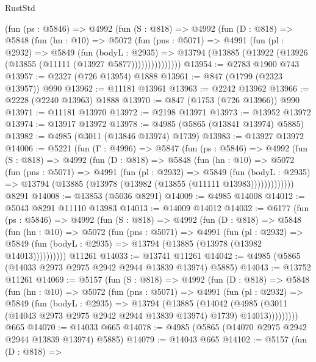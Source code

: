 \begin{lexlean}{RustStd}
\begin{coremodule}
        (fun (ps : @5846) =>
        @4992
          (fun (S : @818) =>
          @4992
            (fun (D : @818) =>
            @5848
              (fun (hn : @10) =>
              @5072
                (fun (pns : @5071) =>
                @4991
                  (fun (pl : @2932) =>
                  @5849
                    (fun (bodyL : @2935) =>
                    @13794 (@13885 (@13922 (@13926 (@13855 (@11111 (@13927 @5877)))))))))))))))
@13954 := @2783 @1900 @743
@13957 := @2327 (@726 @13954) @1888
@13961 := @847 (@1799 (@2323 @13957)) @990
@13962 := @11181 @13961
@13963 := @2242 @13962
@13966 := @2228 (@2240 @13963) @1888
@13970 := @847 (@1753 (@726 @13966)) @990
@13971 := @11181 @13970
@13972 := @2198 @13971
@13973 := @13952 @13972
@13974 := @13917 @13972
@13978 := @4985 (@5865 (@13841 @13974) @5885)
@13982 := @4985 (@3011 (@13846 @13974) @1739)
@13983 := @13927 @13972
@14006 := @5221
    (fun (Γ : @4996) =>
    @5847
      (fun (ps : @5846) =>
      @4992
        (fun (S : @818) =>
        @4992
          (fun (D : @818) =>
          @5848
            (fun (hn : @10) =>
            @5072
              (fun (pns : @5071) =>
              @4991
                (fun (pl : @2932) =>
                @5849
                  (fun (bodyL : @2935) =>
                  @13794 (@13885 (@13978 (@13982 (@13855 (@11111 @13983)))))))))))))
    @8291
@14008 := @13853 (@5036 @8291)
@14009 := @4985 @14008
@14012 := @5043 @8291 @11110 @13983
@14013 := @14009 @14012
@14032 := @6177
    (fun (ps : @5846) =>
    @4992
      (fun (S : @818) =>
      @4992
        (fun (D : @818) =>
        @5848
          (fun (hn : @10) =>
          @5072
            (fun (pns : @5071) =>
            @4991
              (fun (pl : @2932) =>
              @5849 (fun (bodyL : @2935) => @13794 (@13885 (@13978 (@13982 @14013))))))))))
    @11261
@14033 := @13741 @11261
@14042 := @4985 (@5865 (@14033 @2973 @2975 @2942 @2944 @13839 @13974) @5885)
@14043 := @13752 @11261
@14069 := @5157
    (fun (S : @818) =>
    @4992
      (fun (D : @818) =>
      @5848
        (fun (hn : @10) =>
        @5072
          (fun (pns : @5071) =>
          @4991
            (fun (pl : @2932) =>
            @5849
              (fun (bodyL : @2935) =>
              @13794
                (@13885
                  (@14042
                    (@4985
                      (@3011 (@14043 @2973 @2975 @2942 @2944 @13839 @13974) @1739)
                      @14013)))))))))
    @665
@14070 := @14033 @665
@14078 := @4985 (@5865 (@14070 @2975 @2942 @2944 @13839 @13974) @5885)
@14079 := @14043 @665
@14102 := @5157
    (fun (D : @818) =>

\end{coremodule}
\end{lexlean}
